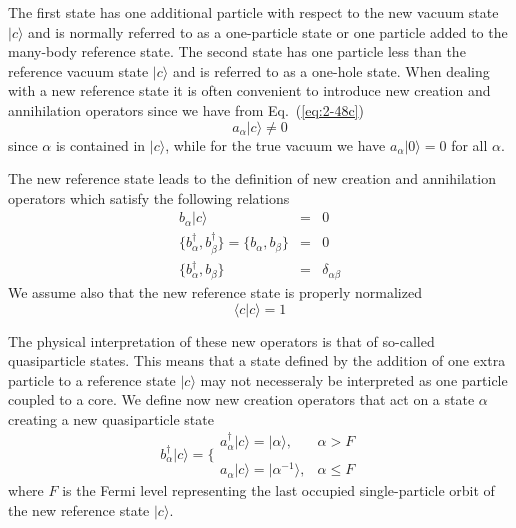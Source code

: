 The first state has one additional particle with respect to the new vacuum state
$|c\rangle $  and is normally referred to as a one-particle state or one particle added to the 
many-body reference state. 
The second state has one particle less than the reference vacuum state  $|c\rangle $ and is referred to as
a one-hole state. 
When dealing with a new reference state it is often convenient to introduce 
new creation and annihilation operators since we have 
from Eq.~(\ref{eq:2-48c})
\begin{equation}
	a_\alpha |c\rangle  \neq 0 \label{eq:2-49}
\end{equation}
since  $\alpha$ is contained  in $|c\rangle $, while for the true vacuum we have 
$a_\alpha |0\rangle  = 0$ for all $\alpha$.

The new reference state leads to the definition of new creation and annihilation operators
which satisfy the following relations
\begin{align}
	b_\alpha |c\rangle  &=& 0 \label{eq:2-50a} \\
	\{b_\alpha^\dagger , b_\beta^\dagger \} = \{b_\alpha , b_\beta \} &=& 0 \nonumber  \\
	\{b_\alpha^\dagger , b_\beta \} &=& \delta_{\alpha \beta} \label{eq:2-50c}
\end{align}
We assume also that the new reference state is properly normalized
\begin{equation}
	\langle c | c \rangle = 1 \label{eq:2-51}
\end{equation}

The physical interpretation of these new operators is that of so-called quasiparticle states.
This means that a state defined by the addition of one extra particle to a reference state $|c\rangle $ may not necesseraly be interpreted as one particle coupled to a core.
We define now new creation operators that act on a state $\alpha$ creating a new quasiparticle state
\begin{equation}
	b_\alpha^\dagger|c\rangle  = \Bigg\{ \begin{array}{ll}
		a_\alpha^\dagger |c\rangle  = |\alpha\rangle, & \alpha > F \\
		\\
		a_\alpha |c\rangle  = |\alpha^{-1}\rangle, & \alpha \leq F
	\end{array} \label{eq:2-52}
\end{equation}
where $F$ is the Fermi level representing the last  occupied single-particle orbit 
of the new reference state $|c\rangle $. 

